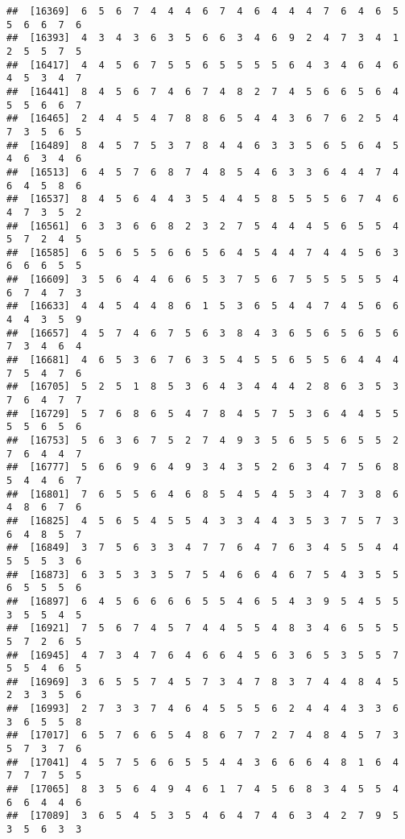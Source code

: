 \documentclass[
]{book}
\begin{document}
\begin{verbatim}
##  [16369]  6  5  6  7  4  4  4  6  7  4  6  4  4  4  7  6  4  6  5  5  6  6  7  6
##  [16393]  4  3  4  3  6  3  5  6  6  3  4  6  9  2  4  7  3  4  1  2  5  5  7  5
##  [16417]  4  4  5  6  7  5  5  6  5  5  5  5  6  4  3  4  6  4  6  4  5  3  4  7
##  [16441]  8  4  5  6  7  4  6  7  4  8  2  7  4  5  6  6  5  6  4  5  5  6  6  7
##  [16465]  2  4  4  5  4  7  8  8  6  5  4  4  3  6  7  6  2  5  4  7  3  5  6  5
##  [16489]  8  4  5  7  5  3  7  8  4  4  6  3  3  5  6  5  6  4  5  4  6  3  4  6
##  [16513]  6  4  5  7  6  8  7  4  8  5  4  6  3  3  6  4  4  7  4  6  4  5  8  6
##  [16537]  8  4  5  6  4  4  3  5  4  4  5  8  5  5  5  6  7  4  6  4  7  3  5  2
##  [16561]  6  3  3  6  6  8  2  3  2  7  5  4  4  4  5  6  5  5  4  5  7  2  4  5
##  [16585]  6  5  6  5  5  6  6  5  6  4  5  4  4  7  4  4  5  6  3  6  6  6  5  5
##  [16609]  3  5  6  4  4  6  6  5  3  7  5  6  7  5  5  5  5  5  4  6  7  4  7  3
##  [16633]  4  4  5  4  4  8  6  1  5  3  6  5  4  4  7  4  5  6  6  4  4  3  5  9
##  [16657]  4  5  7  4  6  7  5  6  3  8  4  3  6  5  6  5  6  5  6  7  3  4  6  4
##  [16681]  4  6  5  3  6  7  6  3  5  4  5  5  6  5  5  6  4  4  4  7  5  4  7  6
##  [16705]  5  2  5  1  8  5  3  6  4  3  4  4  4  2  8  6  3  5  3  7  6  4  7  7
##  [16729]  5  7  6  8  6  5  4  7  8  4  5  7  5  3  6  4  4  5  5  5  5  6  5  6
##  [16753]  5  6  3  6  7  5  2  7  4  9  3  5  6  5  5  6  5  5  2  7  6  4  4  7
##  [16777]  5  6  6  9  6  4  9  3  4  3  5  2  6  3  4  7  5  6  8  5  4  4  6  7
##  [16801]  7  6  5  5  6  4  6  8  5  4  5  4  5  3  4  7  3  8  6  4  8  6  7  6
##  [16825]  4  5  6  5  4  5  5  4  3  3  4  4  3  5  3  7  5  7  3  6  4  8  5  7
##  [16849]  3  7  5  6  3  3  4  7  7  6  4  7  6  3  4  5  5  4  4  5  5  5  3  6
##  [16873]  6  3  5  3  3  5  7  5  4  6  6  4  6  7  5  4  3  5  5  6  5  5  5  6
##  [16897]  6  4  5  6  6  6  6  5  5  4  6  5  4  3  9  5  4  5  5  3  5  5  4  5
##  [16921]  7  5  6  7  4  5  7  4  4  5  5  4  8  3  4  6  5  5  5  5  7  2  6  5
##  [16945]  4  7  3  4  7  6  4  6  6  4  5  6  3  6  5  3  5  5  7  5  5  4  6  5
##  [16969]  3  6  5  5  7  4  5  7  3  4  7  8  3  7  4  4  8  4  5  2  3  3  5  6
##  [16993]  2  7  3  3  7  4  6  4  5  5  5  6  2  4  4  4  3  3  6  3  6  5  5  8
##  [17017]  6  5  7  6  6  5  4  8  6  7  7  2  7  4  8  4  5  7  3  5  7  3  7  6
##  [17041]  4  5  7  5  6  6  5  5  4  4  3  6  6  6  4  8  1  6  4  7  7  7  5  5
##  [17065]  8  3  5  6  4  9  4  6  1  7  4  5  6  8  3  4  5  5  4  6  6  4  4  6
##  [17089]  3  6  5  4  5  3  5  4  6  4  7  4  6  3  4  2  7  9  5  3  5  6  3  3

\end{verbatim}
\end{document}
